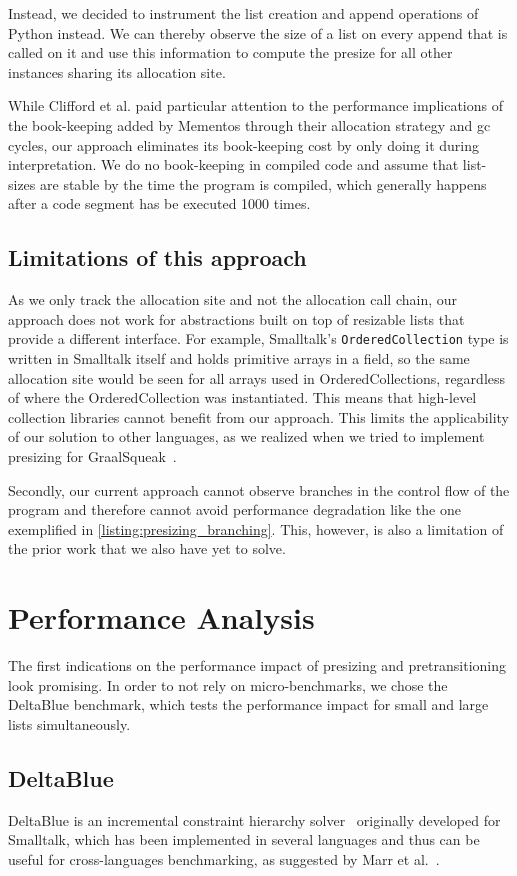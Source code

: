 \documentclass[sigconf, review, balance=false]{acmart}
\newcommand{\ac}[1]{\gls*{#1}}
\begin{document}
Instead, we decided to instrument the list creation and append
operations of Python instead. We can thereby observe the size of a
list on every append that is called on it and use this information to
compute the presize for all other instances sharing its allocation
site.

While Clifford et al. paid particular attention to the performance
implications of the book-keeping added by Mementos through their
allocation strategy and \ac{gc} cycles, our approach eliminates its
book-keeping cost by only doing it during interpretation. We do no
book-keeping in compiled code and assume that list-sizes are stable
by the time the program is compiled, which generally happens after
a code segment has be executed 1000 times.


\subsection*{Limitations of this approach}
As we only track the allocation site and not the allocation call
chain, our approach does not work for abstractions built on top of
resizable lists that provide a different interface. For example,
Smalltalk's \lstinline{OrderedCollection} type is written in Smalltalk
itself and holds primitive arrays in a field, so the same allocation
site would be seen for all arrays used in OrderedCollections,
regardless of where the OrderedCollection was instantiated. This means
that high-level collection libraries cannot benefit from our
approach. This limits the applicability of our solution to other
languages, as we realized when we tried to implement presizing for
GraalSqueak~\cite{niephaus2019graalsqueak}.

Secondly, our current approach cannot observe branches in the control
flow of the program and therefore cannot avoid performance degradation
like the one exemplified in \autoref{listing:presizing_branching}.
This, however, is also a limitation of the prior work that we also
have yet to solve. 


\section{Performance Analysis}%
\label{sec:evaluation}
The first indications on the performance impact of presizing and
pretransitioning look promising. In order to not rely on
micro-benchmarks, we chose the DeltaBlue benchmark, which tests the
performance impact for small and large lists simultaneously.
\subsection{DeltaBlue}
DeltaBlue is an incremental constraint hierarchy
solver~\cite{freeman1989deltablue} originally developed for Smalltalk,
which has been implemented in several languages and thus can be useful
for cross-languages benchmarking, as suggested by Marr et
al.~\cite{marr2016cross}.
\end{document}
